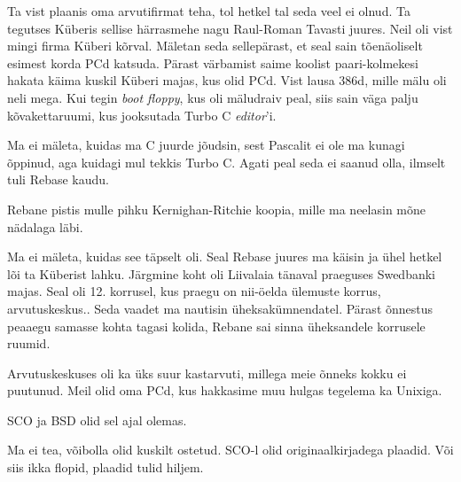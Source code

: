 
Ta vist plaanis oma arvutifirmat teha, tol 
hetkel tal seda veel ei olnud. Ta tegutses Küberis sellise 
härrasmehe nagu Raul-Roman Tavasti juures. Neil 
oli vist mingi firma Küberi kõrval. Mäletan seda sellepärast, et seal sain tõenäoliselt esimest korda PCd katsuda. Pärast värbamist saime koolist paari-kolmekesi hakata käima 
kuskil Küberi majas, kus olid PCd. Vist 
lausa 386d, mille mälu oli neli mega. Kui tegin 
\emph{boot floppy}, kus oli mäludraiv peal, siis sain väga palju 
kõvakettaruumi, kus jooksutada Turbo C \emph{editor}'i.


Ma ei mäleta, kuidas ma C juurde 
jõudsin, sest Pascalit ei ole ma kunagi õppinud, aga kuidagi mul tekkis 
Turbo C. Agati peal seda ei saanud olla, ilmselt tuli Rebase kaudu. 

Rebane pistis mulle pihku Kernighan-Ritchie koopia, mille ma neelasin 
mõne nädalaga läbi.


Ma ei mäleta, kuidas see täpselt oli. Seal Rebase juures ma käisin ja ühel
hetkel lõi ta Küberist lahku. Järgmine koht oli Liivalaia tänaval praeguses
Swedbanki majas. Seal oli 12. korrusel, kus 
praegu on nii-öelda ülemuste korrus, arvutuskeskus.. Seda vaadet ma nautisin üheksakümnendatel. Pärast õnnestus peaaegu samasse kohta tagasi kolida, Rebane sai sinna üheksandele 
korrusele ruumid. 

Arvutuskeskuses oli ka üks suur kastarvuti, millega meie õnneks kokku ei puutunud. Meil olid oma 
PCd, kus hakkasime muu hulgas tegelema ka Unixiga.


SCO ja BSD olid sel ajal olemas.


Ma ei tea, võibolla olid kuskilt ostetud. SCO-l olid originaalkirjadega plaadid. Või siis ikka flopid, 
plaadid tulid hiljem. 

